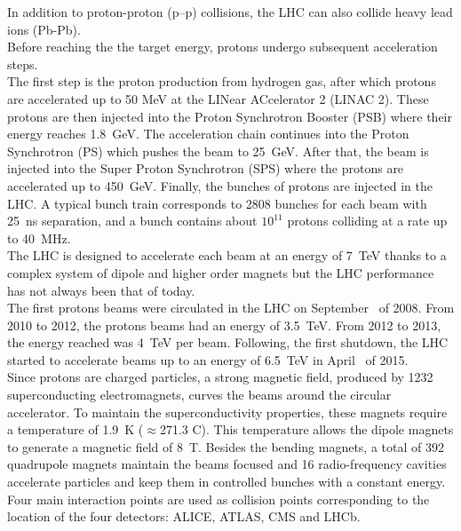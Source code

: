In addition to proton-proton (p--p) collisions, the LHC can also collide heavy lead ions (Pb-Pb). \\
Before reaching the the target energy, protons undergo subsequent acceleration steps. \\
The first step is the proton production from hydrogen gas, after which protons are accelerated up to 50 MeV at the LINear ACcelerator 2 (LINAC 2). These protons are then injected into the 
Proton Synchrotron Booster (PSB) where their energy reaches 1.8~GeV.  The acceleration chain continues into the Proton Synchrotron (PS) which pushes the beam
to 25~GeV. After that, the beam is injected into the Super Proton Synchrotron (SPS) where the protons are accelerated up to 450~GeV. Finally, the bunches of protons are injected in the LHC.
A typical bunch train corresponds to 2808 bunches for each beam with 25~ns separation, and a bunch contains about $\mathrm{10^{11}}$ protons colliding at a rate up to 40~MHz. 
\\The LHC is designed to accelerate each beam at an energy of 7~TeV thanks to a complex system of dipole and higher order magnets but the LHC performance has not always been 
that of today. \\
The first protons beams were circulated in the LHC on September~ of 2008. From 2010 to 2012, the protons
beams had an energy of 3.5~TeV. From 2012 to 2013, the energy reached was 4~TeV per beam. Following, the first shutdown, the LHC started to accelerate
beams up to an energy of 6.5~TeV in April~ of 2015.\\
Since protons are charged particles, a strong magnetic field, produced by 1232 superconducting electromagnets, curves the beams around the circular accelerator.
To maintain the superconductivity properties, these magnets require a temperature of 1.9~K ($\mathrm{\approx}$271.3 \textdegree{}C). 
This temperature allows the dipole magnets to generate a magnetic field of 8~T. Besides the bending magnets, a total of 392 quadrupole magnets maintain the
beams focused and 16 radio-frequency cavities accelerate particles and keep them in controlled bunches with a constant energy.
Four main interaction points are used as collision points corresponding to the location of the four detectors: ALICE, ATLAS, CMS and LHCb.\\
